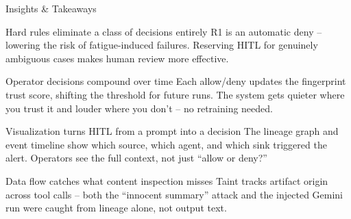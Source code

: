 \documentclass[aspectratio=169]{beamer}
\begin{document}
\begin{frame}{Insights \& Takeaways}
  \footnotesize
  \begin{block}{Hard rules eliminate a class of decisions entirely}
    R1 is an automatic deny -- lowering the risk of fatigue-induced failures.
    Reserving HITL for genuinely ambiguous cases makes human review more effective.
  \end{block}
  \pause
  \vspace{0.1em}
  \begin{block}{Operator decisions compound over time}
    Each allow/deny updates the fingerprint trust score, shifting the threshold for future runs.
    The system gets quieter where you trust it and louder where you don't -- no retraining needed.
  \end{block}
  \pause
  \vspace{0.1em}
  \begin{block}{Visualization turns HITL from a prompt into a decision}
    The lineage graph and event timeline show which source, which agent, and which sink
    triggered the alert. Operators see the full context, not just ``allow or deny?''
  \end{block}
  \pause
  \vspace{0.1em}
  \begin{block}{Data flow catches what content inspection misses}
    Taint tracks artifact origin across tool calls -- both the ``innocent summary'' attack
    and the injected Gemini run were caught from lineage alone, not output text.
  \end{block}
\end{frame}
\end{document}
